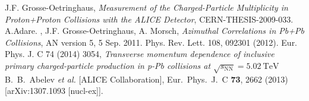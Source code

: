\documentclass[ALICE,manyauthors]{ALICE_internal_notes}
\begin{document}

\begin{thebibliography}{9}
%
%
  J.F. Grosse-Oetringhaus,  \emph{Measurement of the Charged-Particle Multiplicity in Proton+Proton Collisions with the ALICE Detector},  CERN-THESIS-2009-033.
  A.Adare. ,  J.F. Grosse-Oetringhaus, A. Morsch,  \emph{ Azimuthal Correlations  in Pb+Pb Collisions}, AN version 5, 5 Sep. 2011. 
 Phys. Rev. Lett. 108, 092301 (2012).
 Eur. Phys. J. C 74 (2014) 3054, \emph{Transverse momentum dependence of inclusive primary charged-particle production in p-Pb collisions at $\sqrt{s_\mathrm{{NN}}}=5.02~\text {TeV}$}
  B.~B.~Abelev {\it et al.}  [ALICE Collaboration],
  Eur.\ Phys.\ J.\ C {\bf 73}, 2662 (2013)
  [arXiv:1307.1093 [nucl-ex]].
\end{thebibliography}
\end{document}
